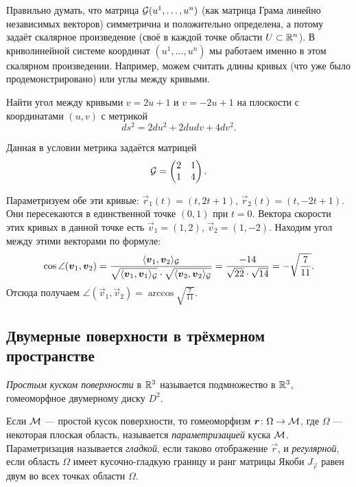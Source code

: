 Правильно думать, что матрица $\mathcal{G}(u^1, \ldots, u^n)$ (как матрица Грама линейно независимых векторов) симметрична и положительно определена, а потому задаёт скалярное произведение (своё в каждой точке области $U \subset \mathbb{R}^n$). В криволинейной системе координат $(u^1, \ldots, u^n)$ мы работаем именно в этом скалярном произведении. Например, можем считать длины кривых (что уже было продемонстрировано) или углы между кривыми.

\begin{problem}
	Найти угол между кривыми $v = 2u + 1$ и $v = -2u + 1$ на плоскости с координатами $(u, v)$ с метрикой
	\[
		ds^2 = 2du^2 + 2dudv + 4dv^2.
	\]
\end{problem}

\begin{solution}
	Данная в условии метрика задаётся матрицей
	\[
		\mathcal{G} =
		\begin{pmatrix}
			2 & 1\\
			1 & 4
		\end{pmatrix}.
	\]

	Параметризуем обе эти кривые: $\vec{r}_1(t) = (t, 2t + 1)$, $\vec{r}_2(t) = (t, -2t + 1)$. Они пересекаются в единственной точке $(0, 1)$ при $t = 0$. Вектора скорости этих кривых в данной точке есть $\vec{v}_1 = (1, 2)$, $\vec{v}_2 = (1, -2)$. Находим угол между этими векторами по формуле:
	\[
		\cos\angle(\boldsymbol{v}_1, \boldsymbol{v}_2) = \frac{\langle\boldsymbol{v}_1, \boldsymbol{v}_2\rangle_{\mathcal{G}}}{\sqrt{\langle\boldsymbol{v}_1, \boldsymbol{v}_1\rangle_{\mathcal{G}}} \cdot \sqrt{\langle\boldsymbol{v}_2, \boldsymbol{v}_2\rangle_{\mathcal{G}}}} = \frac{-14}{\sqrt{22} \cdot \sqrt{14}} = -\sqrt{\frac{7}{11}}.
	\]
	Отсюда получаем $\angle(\vec{v}_1, \vec{v}_2) = \arccos\sqrt{\frac{7}{11}}$.
\end{solution}

\subsection{Двумерные поверхности в трёхмерном пространстве}

\begin{definition}
	\textit{Простым куском поверхности} в $\mathbb{R}^3$ называется подмножество в $\mathbb{R}^3$, гомеоморфное двумерному диску $D^2$.
\end{definition}

\begin{definition}
	Если $\mathcal{M}$ --- простой кусок поверхности, то гомеоморфизм $\boldsymbol{r}\colon \Omega \to \mathcal{M}$, где $\Omega$ --- некоторая плоская область\footnotemark, называется \textit{параметризацией} куска $\mathcal{M}$. Параметризация называется \textit{гладкой}, если таково отображение $\vec{r}$, и \textit{регулярной}, если область $\Omega$ имеет кусочно-гладкую границу и ранг матрицы Якоби $J_{\vec{r}}$ равен двум во всех точках области $\Omega$.
\end{definition}

